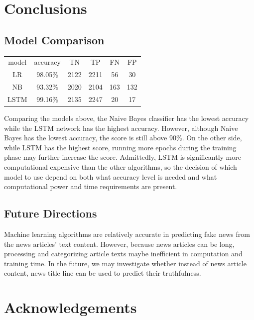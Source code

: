\documentclass{article}
\begin{document}
\begin{multicols}{2}
\section{Conclusions}

\subsection{Model Comparison}

\begin{center}
\begin{tabular}{ c c c c c c}
 model & accuracy & TN & TP & FN & FP \\ 
LR & 98.05\% & 2122  & 2211 & 56 & 30\\ 
NB & 93.32\% & 2020 & 2104 & 163 & 132\\
LSTM & 99.16\% & 2135 & 2247 & 20 & 17 \\
\end{tabular}
\end{center}

Comparing the models above, the Naive Bayes classifier has the lowest accuracy while the LSTM network has the highest accuracy. However, although Naive Bayes has the lowest accuracy, the score is still above 90\%. On the other side, while LSTM has the highest score, running more epochs during the training phase may further increase the score. Admittedly, LSTM is significantly more computational expensive than the other algorithms, so the decision of which model to use depend on both what accuracy level is needed and what computational power and time requirements are present. 

\subsection{Future Directions}

Machine learning algorithms are relatively accurate in predicting fake news from the news articles' text content. However, because news articles can be long, processing and categorizing article texts maybe inefficient in computation and training time. In the future, we may investigate whether instead of news article content, news title line can be used to predict their truthfulness. 




\section{Acknowledgements}


\end{multicols}
\end{document}
